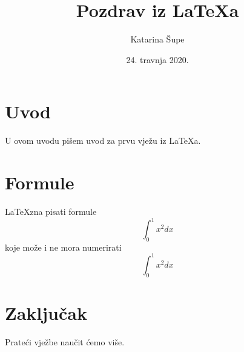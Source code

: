 \documentclass{article}
\title{Pozdrav iz \LaTeX a}
\author{Katarina Šupe}
\date{24. travnja 2020.}
\begin{document}
\maketitle
\tableofcontents
\newpage
\section{Uvod}
U ovom uvodu pišem uvod za prvu vježu iz \LaTeX a. 
\newpage
\section{Formule}
\LaTeX zna pisati formule
\begin{equation}
    \int_{0}^{1} x^2 dx
\end{equation}
koje može i ne mora numerirati
$$\int_{0}^{1} x^2 dx$$
\newpage
\section{Zaključak}
Prateći vježbe naučit ćemo više.
\end{document}

